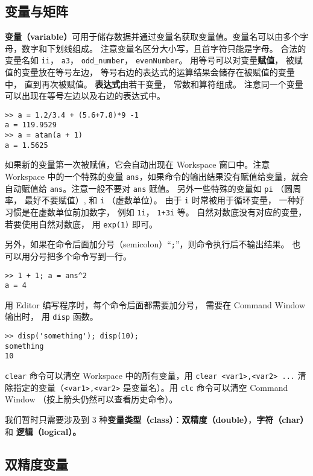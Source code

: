 

\subsection{变量与矩阵}
\textbf{变量（variable）}可用于储存数据并通过变量名获取变量值。变量名可以由多个字母，数字和下划线组成。 注意变量名区分大小写，且首字符只能是字母。 合法的变量名如 \verb|ii|， \verb|a3|， \verb|odd_number|， \verb|evenNumber|。 用等号可以对变量\textbf{赋值}， 被赋值的变量放在等号左边， 等号右边的表达式的运算结果会储存在被赋值的变量中， 直到再次被赋值。 \textbf{表达式}由若干变量， 常数和算符组成。 注意同一个变量可以出现在等号左边以及右边的表达式中。
\begin{lstlisting}[language=matlabC]
>> a = 1.2/3.4 + (5.6+7.8)*9 -1
a = 119.9529
>> a = atan(a + 1)
a = 1.5625
\end{lstlisting}
如果新的变量第一次被赋值，它会自动出现在 Workspace 窗口中。注意 Workspace 中的一个特殊的变量 \verb|ans|，如果命令的输出结果没有赋值给变量，就会自动赋值给 \verb|ans|。注意一般不要对 \verb|ans| 赋值。 另外一些特殊的变量如 \verb|pi| （圆周率， 最好不要赋值）, 和 \verb|i| （虚数单位）。 由于 \verb|i| 时常被用于循环变量， 一种好习惯是在虚数单位前加数字， 例如 \verb|1i|， \verb|1+3i| 等。 自然对数底没有对应的变量， 若要使用自然对数底， 用 \verb|exp(1)| 即可。

另外，如果在命令后面加分号（semicolon）“\verb|;|”，则命令执行后不输出结果。 也可以用分号把多个命令写到一行。
\begin{lstlisting}[language=matlabC]
>> 1 + 1; a = ans^2
a = 4
\end{lstlisting}
用 Editor 编写程序时，每个命令后面都需要加分号， 需要在 Command Window 输出时， 用 \verb|disp| 函数。
\begin{lstlisting}[language=matlabC]
>> disp('something'); disp(10);
something
10
\end{lstlisting}

\verb|clear| 命令可以清空 Workspace 中的所有变量，用 \verb|clear <var1>,<var2> ...| 清除指定的变量（\verb|<var1>,<var2>| 是变量名）。用 \verb|clc| 命令可以清空 Command Window （按上箭头仍然可以查看历史命令）。

我们暂时只需要涉及到 3 种\textbf{变量类型（class）}：\textbf{双精度（double）}，\textbf{字符（char）} 和 \textbf{逻辑（logical）。}

\subsection{双精度变量}

